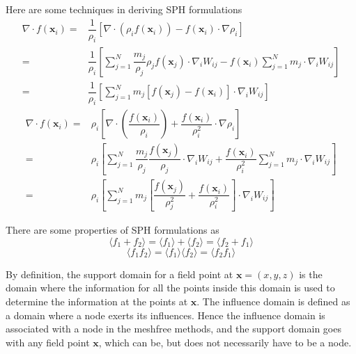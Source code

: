 \documentclass[letterpaper,12pt]{article}
\numberwithin{equation}{section}
\begin{document}
Here are some techniques in deriving SPH formulations
\begin{align}
    \nabla \cdot f(\mathbf{x}_i) =& \dfrac{1}{\rho_i} [ \nabla \cdot (\rho_i f(\mathbf{x}_i) ) - f(\mathbf{x}_i) \cdot \nabla \rho_i ] \nonumber \\
    =& \dfrac{1}{\rho_i} \left[ \sum_{j=1}^N \dfrac{m_j}{\rho_j} \rho_j f(\mathbf{x}_j) \cdot \nabla_i W_{ij} - f(\mathbf{x}_i) \sum_{j=1}^N m_j \cdot \nabla_i W_{ij} \right] \nonumber \\
    =& \dfrac1{\rho_i} \left[ \sum_{j = 1}^N m_j \left[ f(\mathbf{x}_j) - f(\mathbf{x}_i) \right] \cdot \nabla_i W_{ij} \right]
\end{align}
\begin{align}
    \nabla \cdot f(\mathbf{x}_i) =& \rho_i \left[\nabla \cdot \left( \dfrac{f(\mathbf{x}_i)}{\rho_i} \right) + \dfrac{f(\mathbf{x}_i)}{\rho_i^2} \cdot \nabla \rho_i \right] \nonumber \\
    =& \rho_i \left[ \sum_{j=1}^N \dfrac{m_j}{\rho_j} \dfrac{f(\mathbf{x}_j)}{\rho_j} \cdot \nabla_i W_{ij} + \dfrac{f(\mathbf{x}_i)}{\rho_i^2} \sum_{j=1}^N m_j \cdot \nabla_i W_{ij} \right] \nonumber \\
    =& \rho_i \left[ \sum_{j=1}^N m_j \left[ \dfrac{f(\mathbf{x}_j)}{\rho_j^2} + \dfrac{f(\mathbf{x}_i)}{\rho_i^2} \right] \cdot \nabla_i W_{ij} \right]
\end{align}

There are some properties of SPH formulations as
\begin{equation}
    \langle f_1 + f_2 \rangle = \langle f_1 \rangle + \langle f_2 \rangle = \langle f_2 + f_1 \rangle
\end{equation}
\begin{equation}
    \langle f_1 f_2 \rangle = \langle f_1 \rangle \langle f_2 \rangle = \langle f_2 f_1 \rangle
\end{equation}

By definition, the support domain for a field point at $\mathbf{x} = (x, y, z)$ is the domain where the information for all the points inside this domain is used to determine the information at the points at $\mathbf{x}$. The influence domain is defined as a domain where a node exerts its influences. Hence the influence domain is associated with a node in the meshfree methods, and the support domain goes with any field point $\mathbf{x}$, which can be, but does not necessarily have to be a node.
\end{document}

